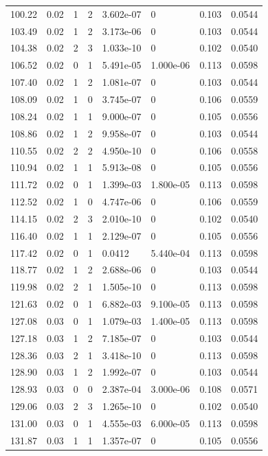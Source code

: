 \documentclass[preview]{standalone}
\begin{document}
{{{\begin{tabular}{L{1.2cm}C{1.2cm} C{0.3cm}C{0.5cm} C{1.4cm}C{1.4cm} C{1.4cm}C{1.4cm}}
  100.22  &  0.02  & 1     &  2 &  3.602e-07  & 0  & 0.103 &  0.0544   \\ 
  103.49  &  0.02  & 1     &  2 &  3.173e-06  & 0  & 0.103 &  0.0544   \\ 
  104.38  &  0.02  & 2     &  3 &  1.033e-10  & 0  & 0.102 &  0.0540   \\ 
  106.52  &  0.02  & 0     &  1 &  5.491e-05  & 1.000e-06  & 0.113 &  0.0598   \\ 
  107.40  &  0.02  & 1     &  2 &  1.081e-07  & 0  & 0.103 &  0.0544   \\ 
  108.09  &  0.02  & 1     &  0 &  3.745e-07  & 0  & 0.106 &  0.0559   \\ 
  108.24  &  0.02  & 1     &  1 &  9.000e-07  & 0  & 0.105 &  0.0556   \\ 
  108.86  &  0.02  & 1     &  2 &  9.958e-07  & 0  & 0.103 &  0.0544   \\ 
  110.55  &  0.02  & 2     &  2 &  4.950e-10  & 0  & 0.106 &  0.0558   \\ 
  110.94  &  0.02  & 1     &  1 &  5.913e-08  & 0  & 0.105 &  0.0556   \\ 
  111.72  &  0.02  & 0     &  1 &  1.399e-03  & 1.800e-05  & 0.113 &  0.0598   \\ 
  112.52  &  0.02  & 1     &  0 &  4.747e-06  & 0  & 0.106 &  0.0559   \\ 
  114.15  &  0.02  & 2     &  3 &  2.010e-10  & 0  & 0.102 &  0.0540   \\ 
  116.40  &  0.02  & 1     &  1 &  2.129e-07  & 0  & 0.105 &  0.0556   \\ 
  117.42  &  0.02  & 0     &  1 &  0.0412  & 5.440e-04  & 0.113 &  0.0598   \\ 
  118.77  &  0.02  & 1     &  2 &  2.688e-06  & 0  & 0.103 &  0.0544   \\ 
  119.98  &  0.02  & 2     &  1 &  1.505e-10  & 0  & 0.113 &  0.0598   \\ 
  121.63  &  0.02  & 0     &  1 &  6.882e-03  & 9.100e-05  & 0.113 &  0.0598   \\ 
  127.08  &  0.03  & 0     &  1 &  1.079e-03  & 1.400e-05  & 0.113 &  0.0598   \\ 
  127.18  &  0.03  & 1     &  2 &  7.185e-07  & 0  & 0.103 &  0.0544   \\ 
  128.36  &  0.03  & 2     &  1 &  3.418e-10  & 0  & 0.113 &  0.0598   \\ 
  128.90  &  0.03  & 1     &  2 &  1.992e-07  & 0  & 0.103 &  0.0544   \\ 
  128.93  &  0.03  & 0     &  0 &  2.387e-04  & 3.000e-06  & 0.108 &  0.0571   \\ 
  129.06  &  0.03  & 2     &  3 &  1.265e-10  & 0  & 0.102 &  0.0540   \\ 
  131.00  &  0.03  & 0     &  1 &  4.555e-03  & 6.000e-05  & 0.113 &  0.0598   \\ 
  131.87  &  0.03  & 1     &  1 &  1.357e-07  & 0  & 0.105 &  0.0556   \\ 
\hline 
\end{tabular} 

}}}
\end{document}
